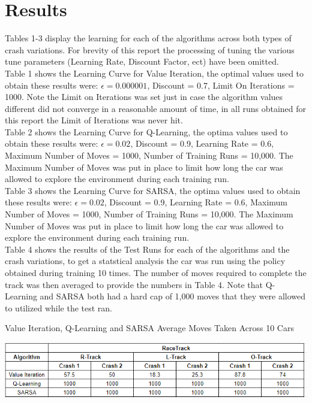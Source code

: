 \documentclass[twoside,11pt]{article}
\begin{document}
\section{Results}
\hspace*{10mm} Tables 1-3 display the learning for each of the algorithms across both types of crash variations. For brevity of this report the processing of tuning the various tune parameters (Learning Rate, Discount Factor, ect) have been omitted.\\ 
Table 1 shows the Learning Curve for Value Iteration, the optimal values used to obtain these results were: $\epsilon = 0.000001$, Discount = 0.7, Limit On Iterations = 1000. Note the Limit on Iterations was set just in case the algorithm values different did not converge in a reasonable amount of time, in all runs obtained for this report the Limit of Iterations was never hit.\\
Table 2 shows the Learning Curve for Q-Learning, the optima values used to obtain these results were: $\epsilon = 0.02$, Discount = 0.9, Learning Rate = 0.6, Maximum Number of Moves = 1000, Number of Training Runs = 10,000. The Maximum Number of Moves was put in place to limit how long the car was allowed to explore the environment during each training run.\\
Table 3 shows the Learning Curve for SARSA, the optima values used to obtain these results were: $\epsilon = 0.02$, Discount = 0.9, Learning Rate = 0.6, Maximum Number of Moves = 1000, Number of Training Runs = 10,000. The Maximum Number of Moves was put in place to limit how long the car was allowed to explore the environment during each training run.\\
Table 4 shows the results of the Test Runs for each of the algorithms and the crash variations, to get a statstical analysis the car was run using the policy obtained during training 10 times. The number of moves required to complete the track was then averaged to provide the numbers in Table 4. Note that Q-Learning and SARSA both had a hard cap of 1,000 moves that they were allowed to utilized while the test ran.\\  

\begin{table}[h]
	\centering
	\caption{Value Iteration, Q-Learning and SARSA Average Moves Taken Across 10 Cars}
	\label{tab:table4}
	\includegraphics[scale=.8]{RunTimeComp_All}\newline
\end{table}
\end{document}
